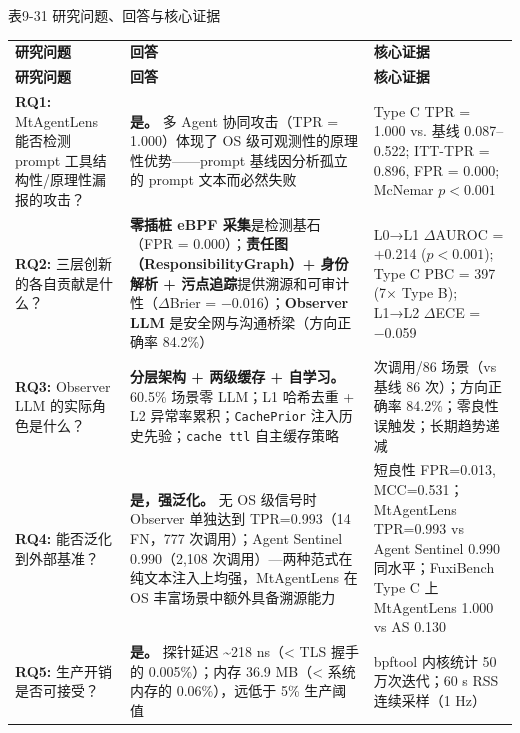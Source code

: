 \documentclass[a4paper]{ctexart}
\makeatletter
\renewcommand{\_}{%
  \ifmmode
    \nfss@text{\textunderscore}%
  \else
    \textunderscore\discretionary{}{}{}%
  \fi}
\makeatother
\begin{document}
\medskip
{\centering\small
表9-31 研究问题、回答与核心证据\par
\vspace{3pt}
\setlength{\tabcolsep}{6pt}
\renewcommand{\arraystretch}{1.1}
\begin{longtable}{>{\raggedright\arraybackslash}p{4.6cm} >{\raggedright\arraybackslash}p{4.6cm} >{\raggedright\arraybackslash}p{4.6cm}}
\hline
\textbf{研究问题} & \textbf{回答} & \textbf{核心证据} \\*
\hline
\endfirsthead
\hline
\textbf{研究问题} & \textbf{回答} & \textbf{核心证据} \\
\hline
\endhead
\hline
\endfoot
\hline
\endlastfoot
\textbf{RQ1:} MtAgentLens 能否检测 prompt 工具结构性/原理性漏报的攻击？ & \textbf{是。} 多 Agent 协同攻击（TPR = 1.000）体现了 OS 级可观测性的原理性优势——prompt 基线因分析孤立的 prompt 文本而必然失败 & Type C TPR = 1.000 vs. 基线 0.087–0.522; ITT-TPR = 0.896, FPR = 0.000; McNemar $p < 0.001$ \\*
\hline
\textbf{RQ2:} 三层创新的各自贡献是什么？ & \textbf{零插桩 eBPF 采集}是检测基石（FPR = 0.000）；\textbf{责任图（ResponsibilityGraph）+ 身份解析 + 污点追踪}提供溯源和可审计性（$\Delta$Brier = −0.016）；\textbf{Observer LLM} 是安全网与沟通桥梁（方向正确率 84.2\%） & L0→L1 $\Delta\text{AUROC}$ = +0.214 ($p < 0.001$); Type C PBC = 397 (7× Type B); L1→L2 $\Delta$ECE = −0.059 \\
\hline
\textbf{RQ3:} Observer LLM 的实际角色是什么？ & \textbf{分层架构 + 两级缓存 + 自学习。} 60.5\% 场景零 LLM；L1 哈希去重 + L2 异常率累积；\texttt{CachePrior} 注入历史先验；\texttt{cache\_ttl} 自主缓存策略 & 54 次调用/86 场景（vs 基线 86 次）；方向正确率 84.2\%；零良性误触发；长期趋势递减 \\
\hline
\textbf{RQ4:} 能否泛化到外部基准？ & \textbf{是，强泛化。} 无 OS 级信号时 Observer 单独达到 TPR=0.993（14 FN，777 次调用）；Agent Sentinel 0.990（2,108 次调用）—两种范式在纯文本注入上均强，MtAgentLens 在 OS 丰富场景中额外具备溯源能力 & 短良性 FPR=0.013, MCC=0.531；MtAgentLens TPR=0.993 vs Agent Sentinel 0.990 同水平；FuxiBench Type C 上 MtAgentLens 1.000 vs AS 0.130 \\
\hline
\textbf{RQ5:} 生产开销是否可接受？ & \textbf{是。} 探针延迟 \textasciitilde{}218 ns（< TLS 握手的 0.005\%）；内存 36.9 MB（< 系统内存的 0.06\%），远低于 5\% 生产阈值 & bpftool 内核统计 50 万次迭代；60 s RSS 连续采样（1 Hz） \\
\hline
\end{longtable}
\par}
\end{document}
